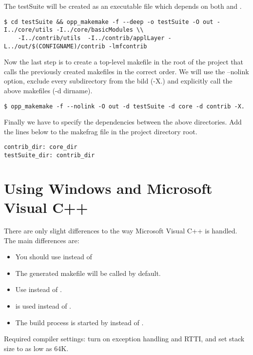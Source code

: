 The testSuite will be created as an executable file which depends on both
 and .

\begin{verbatim}
$ cd testSuite && opp_makemake -f --deep -o testSuite -O out -I../core/utils -I../core/basicModules \\
    -I../contrib/utils  -I../contrib/applLayer -L../out/$(CONFIGNAME)/contrib -lmfcontrib
\end{verbatim}

Now the last step is to create a top-level makefile in the root of the project that
calls the previously created makefiles in the correct order. We will use the
--nolink option, exclude every subdirectory from the bild (-X.) and explicitly call
the above makefiles (-d dirname).

\begin{verbatim}
$ opp_makemake -f --nolink -O out -d testSuite -d core -d contrib -X.
\end{verbatim}

Finally we have to specify the dependencies between the above directories. Add the lines below to the makefrag file
in the project directory root.

\begin{verbatim}
contrib_dir: core_dir
testSuite_dir: contrib_dir
\end{verbatim}

\section{Using Windows and Microsoft Visual C++}

There are only slight differences to the way Microsoft Visual C++
is handled. The main differences are:
\begin{itemize}
  \item{You should use  instead of }
  \item{The generated makefile will be called  by default.}
  \item{Use  instead of .}
  \item{ is used instead of .}
  \item{The build process is started by  instead of .}
\end{itemize}

Required compiler settings: turn on exception handling and RTTI, and
set stack size to as low as 64K.



